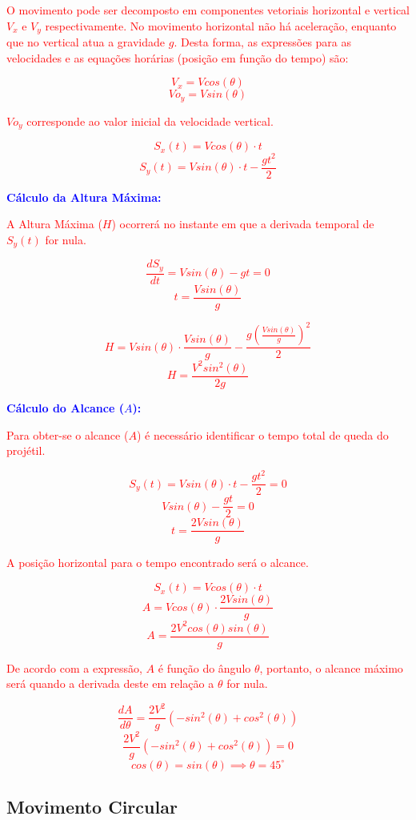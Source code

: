 \documentclass[
    12pt, %
    openright,
    twoside, %
    a4paper, %
    article,
    english,brazil %
]{abntex2}
\begin{document}
\textcolor{red}{O movimento pode ser decomposto em componentes vetoriais horizontal e vertical $V_x$ e $V_y$ respectivamente. No movimento horizontal não há aceleração, enquanto que no vertical atua a gravidade $g$. Desta forma, as expressões para as velocidades e as equações horárias (posição em função do tempo) são:}

\textcolor{red}{
    $$V_x = V cos(\theta)$$
    $$Vo_y = V sin(\theta)$$
}

\textcolor{red}{$Vo_y$ corresponde ao valor inicial da velocidade vertical.}

\textcolor{red}{
    $$S_x(t) = V cos(\theta) \cdot t$$
    $$S_y(t) = V sin(\theta) \cdot t - \frac{gt^2}{2}$$
}

\textcolor{blue}{\textbf{Cálculo da Altura Máxima:}}

\textcolor{red}{A Altura Máxima ($H$) ocorrerá no instante em que a derivada temporal de $S_y(t)$ for nula.}

\textcolor{red}{
    $$\frac{dS_y}{dt} = V sin(\theta) - gt = 0$$
    $$t = \frac{V sin(\theta)}{g}$$
}

\textcolor{red}{
    $$H = V sin(\theta) \cdot \frac{V sin(\theta)}{g} - \frac{g (\frac{V sin(\theta)}{g})^2}{2}$$
    $$H = \frac{V^2 sin^2(\theta)}{2g}$$
}

\textcolor{blue}{\textbf{Cálculo do Alcance ($A$):}}

\textcolor{red}{Para obter-se o alcance ($A$) é necessário identificar o tempo total de queda do projétil.}

\textcolor{red}{
    $$S_y(t) = V sin(\theta) \cdot t - \frac{gt^2}{2} = 0$$
    $$V sin(\theta) - \frac{gt}{2} = 0$$
    $$t = \frac{2V sin(\theta)}{g}$$
}

\textcolor{red}{A posição horizontal para o tempo encontrado será o alcance.}

\textcolor{red}{
    $$S_x(t) = V cos(\theta) \cdot t$$
    $$A = V cos(\theta) \cdot \frac{2V sin(\theta)}{g}$$
    $$A = \frac{2V^2 cos(\theta)sin(\theta)}{g}$$
}

\textcolor{red}{De acordo com a expressão, $A$ é função do ângulo $\theta$, portanto, o alcance máximo será quando a derivada deste em relação a $\theta$ for nula.}

\textcolor{red}{
    $$\frac{dA}{d\theta} = \frac{2V^2}{g}(-sin^2(\theta) + cos^2(\theta))$$
    $$\frac{2V^2}{g}(-sin^2(\theta) + cos^2(\theta)) = 0$$
    $$cos(\theta) = sin(\theta) \implies \theta = 45^\circ$$
}

\subsection{Movimento Circular}
\end{document}
